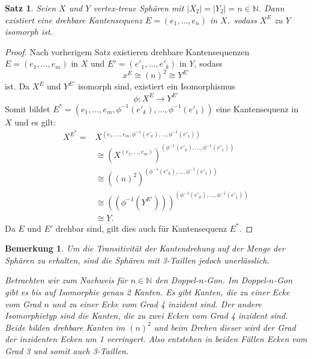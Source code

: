 \documentclass[12pt,titlepage,twoside,cleardoublepage]{article}
\theoremstyle{nummermitklammern}
\newtheorem{bemerkung}[temp]{Bemerkung}
\newtheorem{satz}[temp]{Satz}
\newtheorem{bemerkung}[zahl]{Bemerkung}
\newtheorem{satz}[zahl]{Satz}
\numberwithin{equation}{section}
\begin{document}
\begin{satz} \label{kantendrehung}
Seien $X$ und $Y$ vertex-treue Sphären mit $\vert X_2\vert=\vert Y_2\vert=n\in \mathbb{N}$.
Dann existiert eine drehbare Kantensequenz $E=(e_1,\ldots,e_n)$ in $X,$ sodass  $X^E$ zu $Y$ isomorph ist. 
\end{satz}
\begin{proof}
Nach vorherigem Satz existieren drehbare Kantensequenzen $E=(e_1,\ldots,e_m)$ in $X$ und $E'=(e'_1,\ldots,e'_{k})$ in $Y$, sodass 
\[
x^E\cong (n)^2 \cong Y^{E'}
\] ist.
Da $X^E$ und $Y^{E'}$ isomorph sind, existiert ein Isomorphismus 
\[
\phi: X^E\to Y^{E'}
\]
Somit bildet $E^*=(e_1,\ldots,e_m,\phi^{-1}(e'_{k}),\ldots,\phi^{-1}(e'_{1}))$ eine Kantensequenz in $X$ und es gilt:
\begin{align*}
X^{E^{*}} = &X^{(e_1,\ldots,e_m,\phi^{-1}(e'_{k}),\ldots,\phi^{-1}(e'_{1}))}\\
&\cong (X^{(e_1,\ldots,e_m)})^{(\phi^{-1}(e'_{k}),\ldots,\phi^{-1}(e'_{1}))}\\
&\cong ((n)^2)^{(\phi^{-1}(e'_{k}),\ldots,\phi^{-1}(e'_{1}))}\\
&\cong ((\phi^{-1}(Y^{E'})))^{(\phi^{-1}(e'_{k}),\ldots,\phi^{-1}(e'_{1}))}\\
&\cong Y .
\end{align*}
Da $E$ und $E'$ drehbar sind, gilt dies auch für Kantensequenz $E^*.$
\end{proof}
\begin{bemerkung}
 Um die Transitivität der Kantendrehung auf der Menge der Sphären zu erhalten, sind die Sphären mit 3-Taillen jedoch unerlässlich.

 Betrachten wir zum Nachweis für $n\in \mathbb{N}$ den Doppel-$n$-Gon. Im Doppel-$n$-Gon gibt es bis auf Isomorphie genau 2 Kanten. Es gibt Kanten, die zu einer Ecke vom Grad $n$ und zu einer Ecke vom Grad 4 inzident sind. Der andere Isomorphietyp sind die Kanten, die zu zwei Ecken vom Grad 4 inzident sind. Beide bilden drehbare Kanten im $(n)^2$ und beim Drehen dieser wird der Grad der inzidenten Ecken um 1 verringert. Also entstehen in beiden Fällen Ecken vom Grad 3 und somit auch 3-Taillen.
\end{bemerkung}
\end{document}
